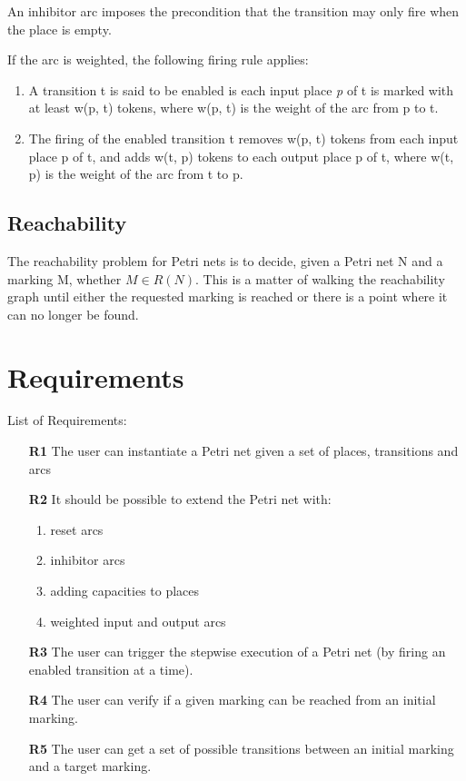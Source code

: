 \documentclass[a4paper]{article}
\begin{document}
An inhibitor arc imposes the precondition that the transition may only fire when the place is empty.

If the arc is weighted, the following firing rule applies:

\begin{enumerate}
	\item A transition t is said to be enabled is each input place \textit{p} of t is marked with at least w(p, t) tokens, where w(p, t) is the weight of the arc from p to t.
    \item The firing of the enabled transition t removes w(p, t) tokens from each input place p of t, and adds w(t, p) tokens to each output place p of t, where w(t, p) is the weight of the arc from t to p.
\end{enumerate}

\subsection{Reachability}

The reachability problem for Petri nets is to decide, given a Petri net N and a marking M, whether $M \in  R(N)$.
This is a matter of walking the reachability graph until either the requested marking is reached or there is a point where it can no longer be found.

\newpage

\section {Requirements}


List of Requirements:

\begin{itemize}
  \item[\textbf{R1}] The user can instantiate a Petri net given a set of places, transitions and arcs
  \item[\textbf{R2}] It should be possible to extend the Petri net with:
  \begin{enumerate}
    \item reset arcs
    \item inhibitor arcs
    \item adding capacities to places
    \item weighted input and output arcs
  \end{enumerate}
  \item [\textbf{R3}] The user can trigger the stepwise execution of a Petri net (by firing an enabled transition at a time).
  \item [\textbf{R4}] The user can verify if a given marking can be reached from an initial marking.
  \item [\textbf{R5}] The user can get a set of possible transitions between an initial marking and a target marking.
\end{itemize}
\end{document}
